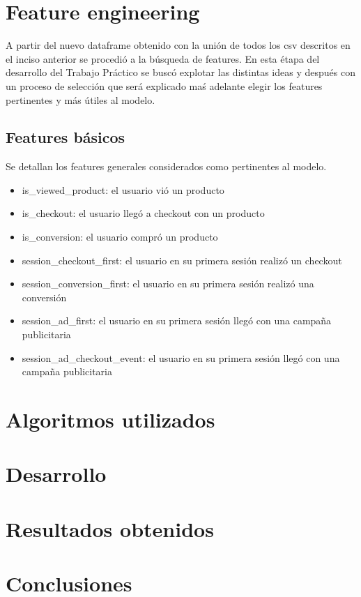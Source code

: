 \documentclass[a4paper]{article}
\begin{document}
\section{Feature engineering}

A partir del nuevo dataframe obtenido con la unión de todos los csv descritos en el inciso anterior se procedió a la búsqueda de features. En esta étapa del desarrollo del Trabajo Práctico se buscó explotar las distintas ideas y después con un proceso de selección que será explicado maś adelante elegir los features pertinentes y más útiles al modelo. 

\subsection{Features básicos}
Se detallan los features generales considerados como pertinentes al modelo.

\begin{itemize}
	\item is\_viewed\_product: el usuario vió un producto
	\item is\_checkout: el usuario llegó a checkout con un producto
	\item is\_conversion: el usuario compró un producto
	\item session\_checkout\_first: el usuario en su primera sesión realizó un checkout
	\item session\_conversion\_first: el usuario en su primera sesión realizó una conversión
	\item session\_ad\_first: el usuario en su primera sesión llegó con una campaña publicitaria
	\item session\_ad\_checkout\_event: el usuario en su primera sesión llegó con una campaña publicitaria
	
\end{itemize}








\section{Algoritmos utilizados}

\section{Desarrollo}

\section{Resultados obtenidos}

\section{Conclusiones}
\end{document}
